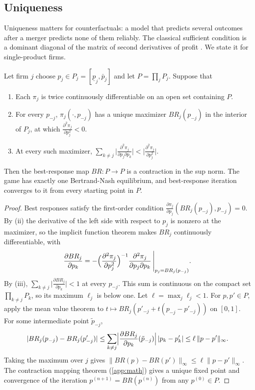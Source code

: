 \subsection{Uniqueness}\label{sec:04-uniqueness}

Uniqueness matters for counterfactuals: a model that predicts several outcomes after a merger predicts none of
them reliably. The classical sufficient condition is a dominant diagonal of the matrix of second derivatives of
profit \citep{Friedman1977}. We state it for single-product firms.

\begin{proposition}\label{prop:04-diag-dominance}
Let firm $j$ choose $p_j \in P_j = [\underline{p}_j, \bar p_j]$ and let $P = \prod_j P_j$. Suppose that
\begin{enumerate}[label=(\roman*)]
  \item Each $\pi_j$ is twice continuously differentiable on an open set containing $P$.
  \item For every $p_{-j}$, $\pi_j(\cdot, p_{-j})$ has a unique maximizer $BR_j(p_{-j})$ in the interior of $P_j$,
  at which $\frac{\partial^2\pi_j}{\partial p_j^2} < 0$.
  \item At every such maximizer,
  $\sum_{k \neq j}\bigl|\frac{\partial^2\pi_j}{\partial p_j\partial p_k}\bigr| < \bigl|\frac{\partial^2\pi_j}{\partial p_j^2}\bigr|$.
\end{enumerate}
Then the best-response map $BR : P \to P$ is a contraction in the sup norm. The game has exactly one Bertrand-Nash
equilibrium, and best-response iteration converges to it from every starting point in $P$.
\end{proposition}

\begin{proof}
Best responses satisfy the first-order condition
$\frac{\partial\pi_j}{\partial p_j}(BR_j(p_{-j}), p_{-j}) = 0$. By (ii) the derivative of the left side with
respect to $p_j$ is nonzero at the maximizer, so the implicit function theorem makes $BR_j$ continuously
differentiable, with
\[
  \frac{\partial BR_j}{\partial p_k} = -\Bigl(\frac{\partial^2\pi_j}{\partial p_j^2}\Bigr)^{-1}\frac{\partial^2\pi_j}{\partial p_j\partial p_k}\,\Bigg|_{p_j = BR_j(p_{-j})}.
\]
By (iii), $\sum_{k \neq j}\bigl|\frac{\partial BR_j}{\partial p_k}\bigr| < 1$ at every $p_{-j}$. This sum is
continuous on the compact set $\prod_{k \neq j}P_k$, so its maximum $\ell_j$ is below one. Let
$\ell = \max_j\ell_j < 1$. For $p, p' \in P$, apply the mean value theorem to
$t \mapsto BR_j(p'_{-j} + t(p_{-j} - p'_{-j}))$ on $[0,1]$. For some intermediate point $\tilde p_{-j}$,
\[
  |BR_j(p_{-j}) - BR_j(p'_{-j})| \le \sum_{k \neq j}\Bigl|\frac{\partial BR_j}{\partial p_k}(\tilde p_{-j})\Bigr|\,|p_k - p'_k| \le \ell\,\|p - p'\|_\infty.
\]
Taking the maximum over $j$ gives $\|BR(p) - BR(p')\|_\infty \le \ell\|p - p'\|_\infty$. The contraction mapping
theorem (\cref{app:math}) gives a unique fixed point and convergence of the iteration $p^{(n+1)} = BR(p^{(n)})$
from any $p^{(0)} \in P$.
\end{proof}

